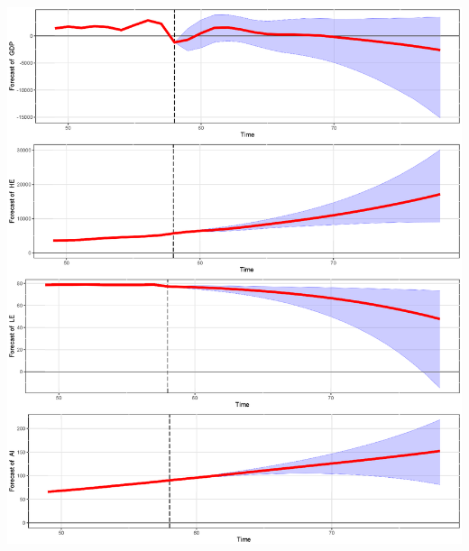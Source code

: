 \documentclass[11pt,preprint, authoryear]{elsarticle}
\let\origfigure\figure
\let\endorigfigure\endfigure
\renewenvironment{figure}[1][2] {
    \expandafter\origfigure\expandafter[H]
} {
    \endorigfigure
}
\numberwithin{equation}{section}
\numberwithin{figure}{section}
\numberwithin{table}{section}
\begin{document}
\begin{figure}
  \centering
  \includegraphics[width=\textwidth]{Forecast_minnesota.eps}
  \caption{Minnesota prior: Estimated forecasts. Periods are in years.}
  \label{for_minnesota}
\end{figure}
\end{document}
